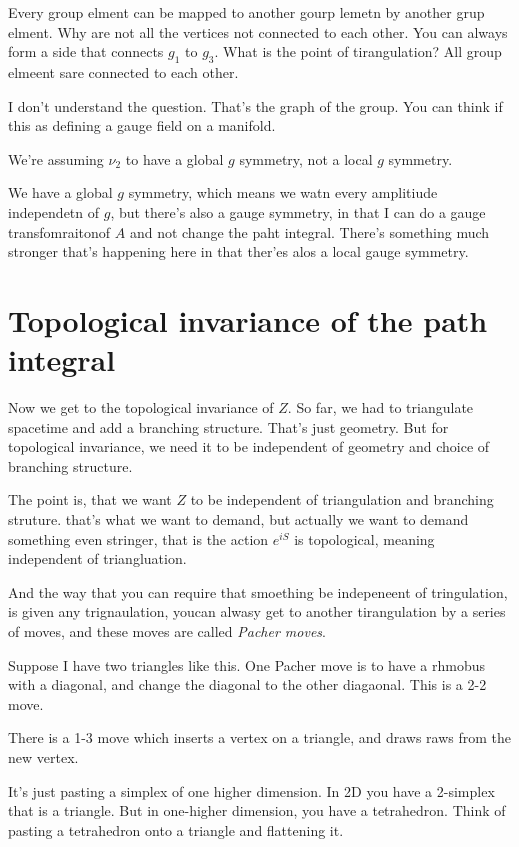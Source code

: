 \begin{question}
    Every group elment can be mapped to another gourp lemetn by another grup
    elment.
    Why are not all the vertices not connected to each other.
    You can always form a side that connects $g_1$ to $g_3$.
    What is the point of tirangulation?
    All group elmeent sare connected to each other.
\end{question}
I don't understand the question.
That's the graph of the group.
You can think if this as defining a gauge field on a manifold.

\begin{question}
    We're assuming $\nu_2$ to have a global $g$ symmetry,
    not a local $g$ symmetry.
\end{question}
We have a global $g$ symmetry,
which means we watn every amplitiude independetn of $g$,
but there's also a gauge symmetry,
in that I can do a gauge transfomraitonof $A$ and not change the paht integral.
There's something much stronger that's happening here in that ther'es alos a
local gauge symmetry.


\section{Topological invariance of the path integral}
Now we get to the topological invariance of $Z$.
So far, 
we had to triangulate spacetime and add a branching structure.
That's just geometry.
But for topological invariance,
we need it to be independent of geometry and choice of branching structure.

The point is,
that we want $Z$ to be independent of triangulation and branching struture.
that's what we want to demand,
but actually we want to demand something even stringer,
that is the action $e^{iS}$ is topological,
meaning independent of triangluation.

And the way that you can require that smoething be indepeneent of tringulation,
is given any trignaulation,
youcan alwasy get to another tirangulation by a series of moves,
and these moves are called \emph{Pacher moves}.

Suppose I have two triangles like this.
One Pacher move is to have a rhmobus with a diagonal,
and change the diagonal to the other diagaonal. This is a 2-2 move.

There is a 1-3 move which inserts a vertex on a triangle,
and draws raws from the new vertex.

It's just pasting a simplex of one higher dimension.
In 2D you have a 2-simplex that is a triangle.
But in one-higher dimension,
you have a tetrahedron.
Think of pasting a tetrahedron onto a triangle and flattening it.

